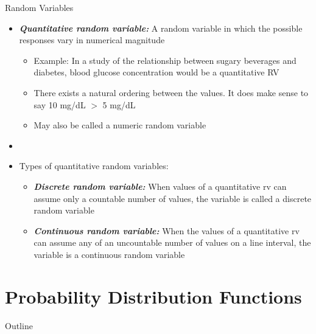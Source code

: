 \documentclass[xcolor=dvipsnames]{beamer}
\begin{document}
\begin{frame}{Random Variables}
	\begin{itemize}
		\item \textbf{\emph{Quantitative random variable:}} A random variable in which the possible responses vary in numerical magnitude \pause
		\begin{itemize}
			\item Example: In a study of the relationship between sugary beverages and diabetes, blood glucose concentration would be a quantitative RV \pause
			\item There exists a natural ordering between the values. It does make sense to say 10 mg/dL $>$ 5 mg/dL \pause
			\item May also be called a numeric random variable
		\end{itemize}
	\item[]
	\item Types of quantitative random variables:
	\begin{itemize}
		\item \textbf{\emph{Discrete random variable:}} When values of a quantitative rv can assume only a countable number of values, the variable is called a discrete random variable \pause
		\item \textbf{\emph{Continuous random variable:}} When the values of a quantitative rv can assume any of an uncountable number of values on a line interval, the variable is a continuous random variable
	\end{itemize}
	\end{itemize}
\end{frame}

\section{Probability Distribution Functions}
\begin{frame}{Outline}
	\tableofcontents[currentsection,subsectionstyle=show/shaded/hide]
\end{frame}
\end{document}
